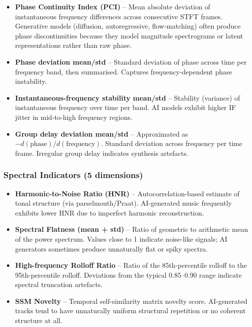 \documentclass[11pt,a4paper]{article}
\begin{document}
\begin{itemize}[nosep]
  \item \textbf{Phase Continuity Index (PCI)} -- Mean absolute deviation of instantaneous frequency differences across consecutive STFT frames. Generative models (diffusion, autoregressive, flow-matching) often produce phase discontinuities because they model magnitude spectrograms or latent representations rather than raw phase.
  \item \textbf{Phase deviation mean/std} -- Standard deviation of phase across time per frequency band, then summarised. Captures frequency-dependent phase instability.
  \item \textbf{Instantaneous-frequency stability mean/std} -- Stability (variance) of instantaneous frequency over time per band. AI models exhibit higher IF jitter in mid-to-high frequency regions.
  \item \textbf{Group delay deviation mean/std} -- Approximated as $-d(\text{phase})/d(\text{frequency})$. Standard deviation across frequency per time frame. Irregular group delay indicates synthesis artefacts.
\end{itemize}

\subsubsection{Spectral Indicators (5 dimensions)}

\begin{itemize}[nosep]
  \item \textbf{Harmonic-to-Noise Ratio (HNR)} -- Autocorrelation-based estimate of tonal structure (via parselmouth/Praat). AI-generated music frequently exhibits lower HNR due to imperfect harmonic reconstruction.
  \item \textbf{Spectral Flatness (mean + std)} -- Ratio of geometric to arithmetic mean of the power spectrum. Values close to 1 indicate noise-like signals; AI generators sometimes produce unnaturally flat or spiky spectra.
  \item \textbf{High-frequency Rolloff Ratio} -- Ratio of the 85th-percentile rolloff to the 95th-percentile rolloff. Deviations from the typical 0.85--0.90 range indicate spectral truncation artefacts.
  \item \textbf{SSM Novelty} -- Temporal self-similarity matrix novelty score. AI-generated tracks tend to have unnaturally uniform structural repetition or no coherent structure at all.
\end{itemize}
\end{document}
